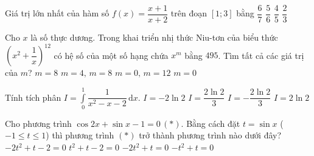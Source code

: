 \begin{ex}%
Giá trị lớn nhất của hàm số $f(x)=\dfrac{x+1}{x+2}$ trên đoạn $[1;3]$ bằng
\choice
{$\dfrac{6}{7}$}
{$\dfrac{5}{6}$}
{\True $\dfrac{4}{5}$}
{$\dfrac{2}{3}$}
\end{ex} 

\begin{ex}%
Cho $x$ là số thực dương. Trong khai triển nhị thức Niu-tơn của biểu thức $\left(x^2+\dfrac{1}{x}\right)^{12}$ có hệ số của một số hạng chứa $x^m$ bằng $495$. Tìm tất cả các giá trị của $m$?
\choice
{$m=8$}
{$m=4,\,m=8$}
{\True $m=0,\,m=12$}
{$m=0$}
\end{ex}

\begin{ex}%
Tính tích phân $I=\displaystyle\int\limits_{0}^{1}\dfrac{1}{x^2-x-2}\mathrm{\,d}x$.
\choice
{$I=-2\ln2$}
{$I=\dfrac{2\ln2}{3}$}
{\True $I=-\dfrac{2\ln2}{3}$}
{$I=2\ln2$}
\end{ex}

\begin{ex}%
Cho phương trình $\cos2x+\sin x-1=0\,(*)$. Bằng cách đặt $t=\sin x$ ($-1\le t\le 1$) thì phương trình $(*)$ trở thành phương trình nào dưới đây?
\choice
{$-2t^2+t-2=0$}
{$t^2+t-2=0$}
{\True $-2t^2+t=0$}
{$-t^2+t=0$}
\end{ex}


